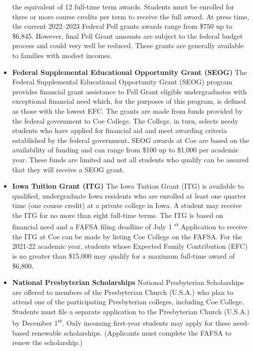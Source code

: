\documentclass[
  letterpaper,
]{scrbook}
\begin{document}
\begin{itemize}
  the equivalent of 12 full-time term awards. Students must be enrolled
  for three or more course credits per term to receive the full award.
  At press time, the current 2022--2023 Federal Pell grants awards range
  from \$750 up to \$6,845. However, final Pell Grant amounts are
  subject to the federal budget process and could very well be reduced.
  These grants are generally available to families with modest incomes.
\item
  \textbf{Federal Supplemental Educational Opportunity Grant (SEOG)} The
  Federal Supplemental Educational Opportunity Grant (SEOG) program
  provides financial grant assistance to Pell Grant eligible
  undergraduates with exceptional financial need which, for the purposes
  of this program, is defined as those with the lowest EFC. The grants
  are made from funds provided by the federal government to Coe College.
  The College, in turn, selects needy students who have applied for
  financial aid and meet awarding criteria established by the federal
  government. SEOG awards at Coe are based on the availability of
  funding and can range from \$100 up to \$1,000 per academic year.
  These funds are limited and not all students who qualify can be
  assured that they will receive a SEOG grant.
\item
  \textbf{Iowa Tuition Grant (ITG)} The Iowa Tuition Grant (ITG) is
  available to qualified, undergraduate Iowa residents who are enrolled
  at least one quarter time (one course credit) at a private college in
  Iowa. A student may receive the ITG for no more than eight full-time
  terms. The ITG is based on financial need and a FAFSA filing deadline
  of July 1 \textsuperscript{st}.Application to receive the ITG at Coe
  can be made by listing Coe College on the FAFSA. For the 2021-22
  academic year, students whose Expected Family Contribution (EFC) is no
  greater than \$15,000 may qualify for a maximum full-time award of
  \$6,800.
\item
  \textbf{National Presbyterian Scholarships} National Presbyterian
  Scholarships are offered to members of the Presbyterian Church
  (U.S.A.) who plan to attend one of the participating Presbyterian
  colleges, including Coe College. Students must file a separate
  application to the Presbyterian Church (U.S.A.) by December
  1\textsuperscript{st}. Only incoming first-year students may apply for
  these need-based renewable scholarships. (Applicants must complete the
  FAFSA to renew the scholarship.)
\end{itemize}
\end{document}
